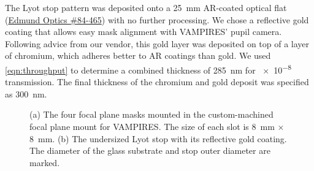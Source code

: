 \documentclass[]{spie}  %
\begin{document}
The Lyot stop pattern was deposited onto a \qty{25}{\milli\meter} AR-coated optical flat (\href{https://www.edmundoptics.com/p/25mm-dia-3mm-thick-nir-i-coated-lambda10-fused-silica-window/27561/}{Edmund Optics \#84-465}) with no further processing. We chose a reflective gold coating that allows easy mask alignment with VAMPIRES' pupil camera. Following advice from our vendor, this gold layer was deposited on top of a layer of chromium, which adheres better to AR coatings than gold. We used \autoref{eqn:throughput} to determine a combined thickness of \qty{285}{\nano\meter} for \num{e-8} transmission. The final thickness of the chromium and gold deposit was specified as \qty{300}{\nano\meter}.

\begin{figure}
   \centering
   \hspace{0.5in}
   \caption{(a) The four focal plane masks mounted in the custom-machined focal plane mount for VAMPIRES. The size of each slot is \qty{8}{\milli\meter} $\times$ \qty{8}{\milli\meter}. (b) The undersized Lyot stop with its reflective gold coating. The diameter of the glass substrate and stop outer diameter are marked.}\label{fig:optics}
\end{figure}
\end{document}
